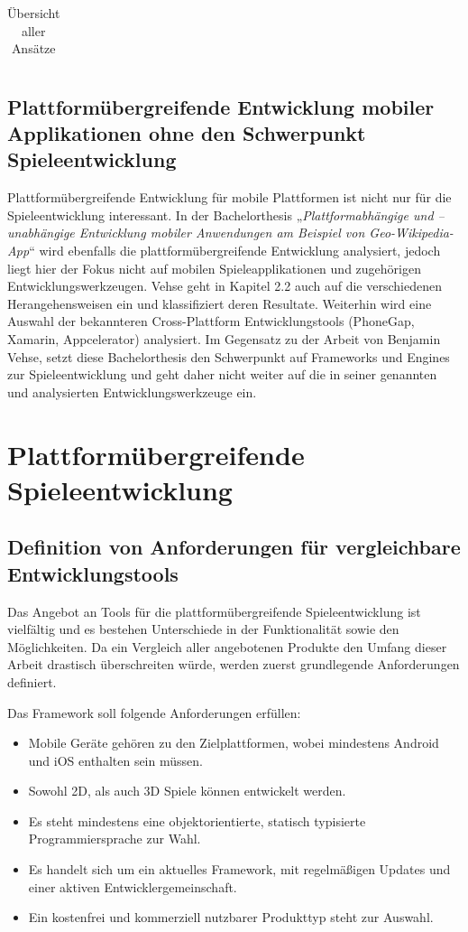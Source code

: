 \begin{table}[htbp]
{\begin{tabular}{|c|c|p{5cm}|p{6cm}|p{}|}
		\end{tabular}
	}
	\caption{Übersicht aller Ansätze}
	\label{table_all_approaches}
\end{table}

\section{Plattformübergreifende Entwicklung mobiler Applikationen ohne den Schwerpunkt Spieleentwicklung}
Plattformübergreifende Entwicklung für mobile Plattformen ist nicht nur für die Spieleentwicklung interessant.
In der Bachelorthesis „\textit{Plattformabhängige und –unabhängige Entwicklung mobiler Anwendungen am Beispiel von Geo-Wikipedia-App}“ \citep{cross_plattform_development_vehse} wird ebenfalls die plattformübergreifende Entwicklung analysiert, jedoch liegt hier der Fokus nicht auf mobilen Spieleapplikationen und zugehörigen Entwicklungswerkzeugen. Vehse geht in Kapitel 2.2 auch auf die verschiedenen Herangehensweisen ein und klassifiziert deren Resultate. Weiterhin wird eine Auswahl der bekannteren Cross-Plattform Entwicklungstools (PhoneGap, Xamarin, Appcelerator) analysiert. Im Gegensatz zu der Arbeit von Benjamin Vehse, setzt diese Bachelorthesis den Schwerpunkt auf Frameworks und Engines zur Spieleentwicklung und geht daher nicht weiter auf die in seiner genannten und analysierten Entwicklungswerkzeuge ein.

\chapter{Plattformübergreifende Spieleentwicklung}

\section{Definition von Anforderungen für vergleichbare Entwicklungstools}
Das Angebot an Tools für die plattformübergreifende Spieleentwicklung ist vielfältig und es bestehen Unterschiede in der Funktionalität sowie den Möglichkeiten. Da ein Vergleich aller angebotenen Produkte den Umfang dieser Arbeit drastisch überschreiten würde, werden zuerst grundlegende Anforderungen definiert.
 
\bigskip
Das Framework soll folgende Anforderungen erfüllen:
\begin{itemize}
	\item Mobile Geräte gehören zu den Zielplattformen, wobei mindestens Android und iOS enthalten sein müssen.
	\item Sowohl 2D, als auch 3D Spiele können entwickelt werden.
	\item Es steht mindestens eine objektorientierte, statisch typisierte Programmiersprache zur Wahl.
	\item Es handelt sich um ein aktuelles Framework, mit regelmäßigen Updates und einer aktiven Entwicklergemeinschaft.
	\item Ein kostenfrei und kommerziell nutzbarer Produkttyp steht zur Auswahl.
\end{itemize}

